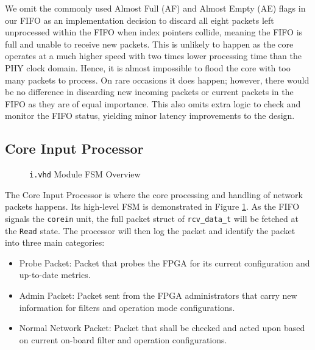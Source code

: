 \documentclass[a4paper]{report}
\newcommand{\code}{\texttt}
\begin{document}
We omit the commonly used Almost Full (AF) and Almost Empty (AE) flags in our FIFO as an implementation decision to discard all eight packets left unprocessed within the FIFO when index pointers collide, meaning the FIFO is full and unable to receive new packets. This is unlikely to happen as the core operates at a much higher speed with two times lower processing time than the PHY clock domain. Hence, it is almost impossible to flood the core with too many packets to process. On rare occasions it does happen; however, there would be no difference in discarding new incoming packets or current packets in the FIFO as they are of equal importance. This also omits extra logic to check and monitor the FIFO status, yielding minor latency improvements to the design.

\subsection{Core Input Processor}

\begin{figure}[h!]
  \caption{\code{i.vhd} Module FSM Overview}
  \label{fig:corein-fsm}
\end{figure}

The Core Input Processor is where the core processing and handling of network packets happens. Its high-level FSM is demonstrated in Figure \ref{fig:corein-fsm}. As the FIFO signals the \code{corein} unit, the full packet struct of \code{rcv\_data\_t} will be fetched at the \code{Read} state. The processor will then log the packet and identify the packet into three main categories:
\begin{itemize}
    \item Probe Packet: Packet that probes the FPGA for its current configuration and up-to-date metrics.
    \item Admin Packet: Packet sent from the FPGA administrators that carry new information for filters and operation mode configurations.
    \item Normal Network Packet: Packet that shall be checked and acted upon based on current on-board filter and operation configurations.
\end{itemize}
\end{document}
